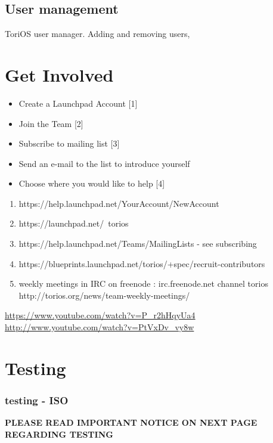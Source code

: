 \documentclass[12pt,a4paper]{book}
\begin{document}
\section{User management}

ToriOS user manager.  Adding and removing users, 

\newpage


\chapter{Get Involved}

\begin{itemize}
\item{Create a Launchpad Account [1]}
\item{Join the Team [2]}
\item{Subscribe to mailing list [3]}
\item{Send an e-mail to the list to introduce yourself}
\item{Choose where you would like to help [4]}
\end{itemize}


\begin{enumerate}
\item {https://help.launchpad.net/YourAccount/NewAccount}
\item {https://launchpad.net/~torios}
\item {https://help.launchpad.net/Teams/MailingLists - see subscribing}
\item{https://blueprints.launchpad.net/torios/+spec/recruit-contributors}
\item{weekly meetings in IRC on freenode : irc.freenode.net  channel torios http://torios.org/news/team-weekly-meetings/ }

\end{enumerate}

\url{https://www.youtube.com/watch?v=P_r2hHqyUa4} \\
\url{http://www.youtube.com/watch?v=PtVxDv_vy8w} \\



\newpage

\chapter{Testing}
\subsection {testing - ISO}
\label{Testing}
\bf{PLEASE READ IMPORTANT NOTICE ON NEXT PAGE REGARDING TESTING}
\end{document}
